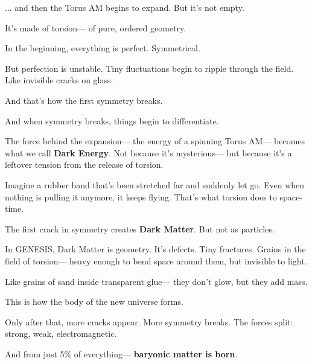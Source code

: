 \documentclass{article}
\begin{document}
\noindent
... and then the Torus AM begins to expand.  
But it’s not empty.

\vspace{1ex}
\noindent
It’s made of torsion—  
of pure, ordered geometry.

\vspace{1ex}
\noindent
In the beginning, everything is perfect.  
Symmetrical.  


\vspace{1ex}
\noindent
But perfection is unstable.  
Tiny fluctuations begin to ripple through the field.  
Like invisible cracks on glass.

\vspace{1ex}
\noindent
And that’s how the first symmetry breaks.

\vspace{1ex}
\noindent
And when symmetry breaks, things begin to differentiate.

\vspace{1ex}
\noindent
The force behind the expansion—  
the energy of a spinning Torus AM—  
becomes what we call \textbf{Dark Energy}.  
Not because it’s mysterious—  
but because it’s a leftover tension from the release of torsion.

\vspace{1ex}
\noindent
Imagine a rubber band that’s been stretched far and suddenly let go.  
Even when nothing is pulling it anymore,  
it keeps flying.  
That’s what torsion does to space-time.

\vspace{1ex}
\noindent
The first crack in symmetry creates \textbf{Dark Matter}.  
But not as particles.

\vspace{1ex}
\noindent
In \textsc{GENESIS}, Dark Matter is geometry.  
It’s defects. Tiny fractures.  
Grains in the field of torsion—  
heavy enough to bend space around them,  
but invisible to light.

\vspace{1ex}
\noindent
Like grains of sand inside transparent glue—  
they don’t glow,  
but they add mass.

\vspace{1ex}
\noindent
This is how the body of the new universe forms.

\vspace{1ex}
\noindent
Only after that, more cracks appear.  
More symmetry breaks.  
The forces split:  
strong, weak, electromagnetic.

\vspace{1ex}
\noindent
And from just 5\% of everything—  
\textbf{baryonic matter is born}.
\end{document}
